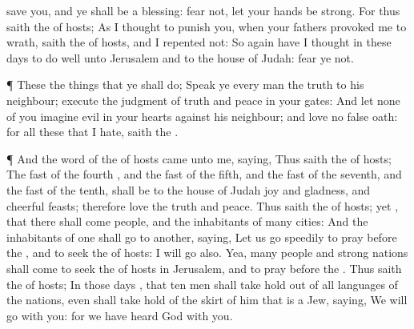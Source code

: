 {save you, and ye shall be a
blessing:
fear not,
{} let your
hands be
strong.
For thus
saith the
{} of
hosts; As I
thought to
punish you, when your
fathers provoked me to
wrath,
saith the
{} of
hosts, and I
repented not:
So
again have I
thought in these
days to do
well unto
Jerusalem and to the
house of
Judah:
fear ye not.
\par }{\PP {}¶ These
{} the
things that ye shall
do;
Speak ye every
man the
truth to his
neighbour;
execute the
judgment of
truth and
peace in your
gates:
And let
none of you
imagine
evil in your
hearts against his
neighbour; and
love no
false
oath: for all these
{} that I
hate,
saith the
{}.
\par }{\PP {}¶ And the
word of the
{} of
hosts came unto me,
saying,
Thus
saith the
{} of
hosts; The
fast of the
fourth
{}, and the
fast of the
fifth, and the
fast of the
seventh, and the
fast of the
tenth, shall be to the
house of
Judah
joy and
gladness, and
cheerful
feasts; therefore
love the
truth and
peace.
Thus
saith the
{} of
hosts;
{} yet
{}, that there shall
come
people, and the
inhabitants of
many
cities:
And the
inhabitants of
one
{} shall
go to
another,
saying, Let us
go
speedily to
pray
before the
{}, and to
seek the
{} of
hosts: I will
go also.
Yea,
many
people and
strong
nations shall
come to
seek the
{} of
hosts in
Jerusalem, and to
pray
before the
{}.
Thus
saith the
{} of
hosts; In those
days
{}, that
ten
men shall take
hold out of all
languages of the
nations, even shall take
hold of the
skirt of him that is a
Jew,
saying, We will
go with you: for we have
heard
{}
God
{} with you.

}
